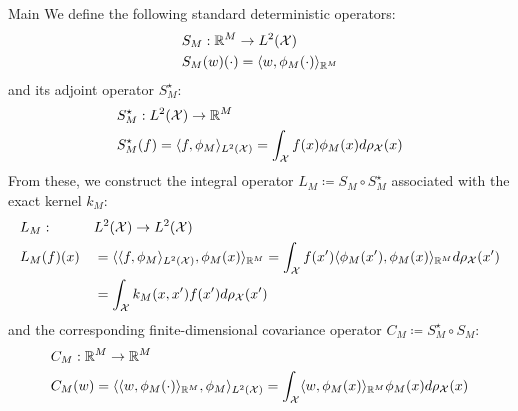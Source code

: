 \begin{chapter}{Main}
 We define the following standard deterministic operators:
 \begin{align*}
      & S_M: \mathbb{R}^M \to L^2(\mathcal{X})                      \\
      & S_M(w)(\cdot) = \langle w, \phi_M(\cdot) \rangle_{\mathbb{R}^M}
 \end{align*}
 and its adjoint operator $S_M^\star$:
 \begin{align*}
      & S_M^\star: L^2(\mathcal{X}) \to \mathbb{R}^M                                                                            \\
      & S_M^\star(f) = \langle f, \phi_M \rangle_{L^2(\mathcal{X})}=\int_{\mathcal{X}} f(x)\phi_M(x) d\rho_{\mathcal{X}}(x)
 \end{align*}
 From these, we construct the integral operator $L_M \coloneqq S_M \circ S_M^\star$ associated with the exact kernel $k_M$:
 \begin{align*}
      & L_M:      &  & L^2(\mathcal{X})  \to L^2(\mathcal{X})                                                                                                                            \\
      & L_M(f)(x) &  & =\langle \langle f, \phi_M \rangle_{L^2(\mathcal{X})}, \phi_M(x) \rangle_{\mathbb{R}^M} = \int_{\mathcal{X}}f(x')\langle \phi_M(x'), \phi_M(x) \rangle_{\mathbb{R}^M} d\rho_{\mathcal{X}}(x') \\
      & \qquad    &  & = \int_{\mathcal{X}}k_M(x, x') f(x') d\rho_{\mathcal{X}}(x')
 \end{align*}
 and the corresponding finite-dimensional covariance operator $C_M \coloneqq S_M^\star \circ S_M$:
 \begin{align*}
      & C_M: \mathbb{R}^M \to \mathbb{R}^M                                                                                                                                                     \\
      & C_M(w) = \langle \langle w, \phi_M(\cdot) \rangle_{\mathbb{R}^M}, \phi_M \rangle_{L^2(\mathcal{X})} = \int_{\mathcal{X}}\langle w, \phi_M(x) \rangle_{\mathbb{R}^M}\phi_M(x)d\rho_{\mathcal{X}}(x)
 \end{align*}


\end{chapter}
